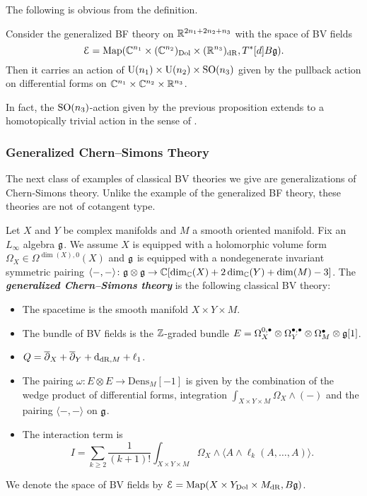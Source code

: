 \documentclass[10pt, oneside]{article}
\newcommand{\Dens}{\mathrm{Dens}}
\renewcommand{\U}{\mathrm{U}}
\newcommand{\defterm}[1]{\textbf{\emph{#1}}}
\begin{document}
The following is obvious from the definition.

\begin{prop}
Consider the generalized BF theory on $\mathbb R^{2n_1+2n_2+n_3}$ with the space of BV fields
\[\mathcal E = \operatorname{Map}(\mathbb C^{n_1}\times (\mathbb C^{n_2})_{\mathrm{Dol}}\times (\mathbb R^{n_3})_{\mathrm{dR}}, T^*[d] B\mathfrak g).\]
Then it carries an action of $\U(n_1)\times \U(n_2)\times \SO(n_3)$ given by the pullback action on differential forms on $\mathbb C^{n_1}\times \mathbb C^{n_2}\times \mathbb R^{n_3}$.
\label{prop:BFrotationaction}
\end{prop}

\begin{remark}
In fact, the $\mathrm{SO}(n_3)$-action given by the previous proposition extends to a homotopically trivial action in the sense of \cite[Section 2.4]{ElliottSafronov}.
\end{remark}

\subsubsection{Generalized Chern--Simons Theory} \label{gen_CS_section}
The next class of examples of classical BV theories we give are generalizations of Chern-Simons theory. Unlike the example of the generalized BF theory, these theories are not of cotangent type.

\begin{definition}
Let $X$ and $Y$ be complex manifolds and $M$ a smooth oriented manifold. Fix an $L_\infty$ algebra $\mathfrak g$. We assume $X$ is equipped with a holomorphic volume form $\Omega_X \in\Omega^{\dim(X), 0}(X)$ and $\mathfrak g$ is equipped with a nondegenerate invariant symmetric pairing $\langle-, -\rangle\colon \mathfrak g\otimes\mathfrak g\rightarrow \mathbb C[\dim_\mathbb C(X) + 2\dim_\mathbb C(Y) + \dim(M) - 3]$. The \defterm{generalized Chern--Simons theory} is the following classical BV theory:
\begin{itemize}
\item The spacetime is the smooth manifold $X\times Y\times M$.

\item The bundle of BV fields is the $\mathbb Z$-graded bundle $E = \Omega^{0,\bullet}_X \otimes \Omega^{\bullet,\bullet}_Y \otimes \Omega^\bullet_M \otimes \mathfrak g[1]$.

\item $Q = \overline{\partial}_X + \overline{\partial}_Y + {\rm d}_{\mathrm{dR}, M} + \ell_1$.

\item The pairing $\omega\colon E\otimes E\rightarrow \Dens_M[-1]$ is given by the combination of the wedge product of differential forms, integration $\int_{X\times Y\times M} \Omega_X\wedge (-)$ and the pairing $\langle -, -\rangle$ on $\mathfrak g$.

\item The interaction term is
\[I = \sum_{k\geq 2}\frac{1}{(k+1)!} \int_{X\times Y\times M} \Omega_X\wedge \langle A\wedge \ell_k(A, \dots, A)\rangle.\]
\end{itemize}
We denote the space of BV fields by $\mathcal E = \operatorname{Map}(X\times Y_{\mathrm{Dol}}\times M_{\mathrm{dR}}, B \mathfrak g)$.
\label{def:generalizedCS}
\end{definition}
\end{document}
